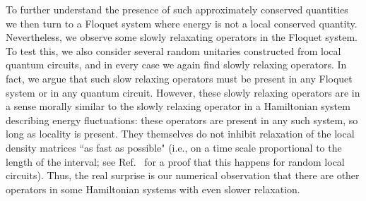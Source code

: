 \documentclass[twocolumn,superscriptaddress, prb]{revtex4-1}
\begin{document}
To further understand the presence of such approximately conserved quantities we then turn to a Floquet system where energy is not a local conserved quantity.
Nevertheless, we observe some slowly relaxating operators in the Floquet system.
To test this, we also consider several random unitaries constructed from local quantum circuits, and in every case we again find slowly relaxing operators.
In fact, we argue that such slow relaxing operators must be present in any Floquet system or in any quantum circuit.  However, these slowly relaxing operators are in a sense morally similar to the slowly relaxing operator in a Hamiltonian system describing energy fluctuations: these operators are present in any such system, so long as locality is present.  They themselves do not inhibit relaxation of the local density matrices ``as fast as possible" (i.e., on a time scale proportional to the length of the interval; see Ref.~ for a proof that this happens for random local circuits).  Thus, the real surprise is our numerical observation that there are other operators in some Hamiltonian systems with even slower relaxation.

\end{document}
